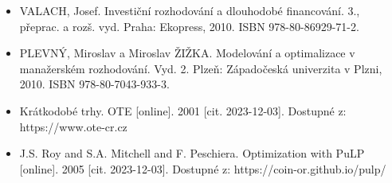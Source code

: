 \documentclass[a4paper, 12pt]{article}
\begin{document}
\begin{itemize}
    \item VALACH, Josef. Investiční rozhodování a dlouhodobé financování. 3., přeprac. a rozš. vyd. Praha: Ekopress, 2010. ISBN 978-80-86929-71-2.
    \item PLEVNÝ, Miroslav a Miroslav ŽIŽKA. Modelování a optimalizace v manažerském rozhodování. Vyd. 2. Plzeň: Západočeská univerzita v Plzni, 2010. ISBN 978-80-7043-933-3.
    \item Krátkodobé trhy. OTE [online]. 2001 [cit. 2023-12-03]. Dostupné z: https://www.ote-cr.cz
    \item J.S. Roy and S.A. Mitchell and F. Peschiera. Optimization with PuLP [online]. 2005 [cit. 2023-12-03]. Dostupné z: https://coin-or.github.io/pulp/
\end{itemize}
\end{document}
